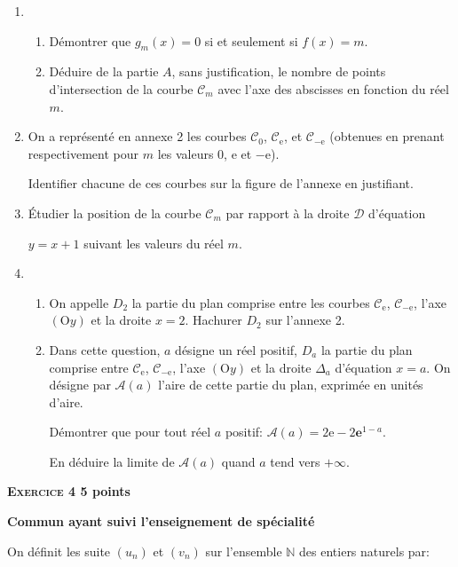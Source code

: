 \documentclass[10pt]{article}
\newcommand{\N}{\mathbb{N}}
\def\e{\text{e}}
\begin{document}
\begin{enumerate}
\item
	\begin{enumerate}
		\item Démontrer que $g_m(x) = 0$ si et seulement si $f(x)=m$.
		\item Déduire de la partie $A$, sans justification, le nombre de points d'intersection de la courbe $\mathcal{C}_m$ avec l'axe des abscisses en fonction du réel $m$.
	\end{enumerate}
\item On a représenté en annexe 2 les courbes $\mathcal{C}_0$, $\mathcal{C}_{\e}$, et $\mathcal{C}_{-\text{e}}$ (obtenues en prenant respectivement pour $m$ les valeurs 0, $\text{e}$ et $-\text{e}$).

Identifier chacune de ces courbes sur la figure de l'annexe en justifiant.
\item Étudier la position de la courbe $\mathcal{C}_m$ par rapport à la droite $\mathcal{D}$ d'équation 

$y = x + 1$ suivant les valeurs du réel $m$.
\item 
	\begin{enumerate}
		\item On appelle $D_2$ la partie du plan comprise entre les courbes $\mathcal{C}_{\text{e}}$, $\mathcal{C}_{-\text{e}}$, l'axe $(\text{O}y)$ et la droite $x = 2$. Hachurer $D_2$ sur l'annexe 2.
		\item Dans cette question, $a$ désigne un réel positif, $D_a$ la partie du plan comprise entre $\mathcal{C}_{\text{e}}$, $\mathcal{C}_{-\text{e}}$, l'axe $(\text{O}y)$ et la droite $\Delta_a$ d'équation $x=a$. On désigne par $\mathcal{A}(a)$ l'aire de cette partie du plan, exprimée en unités d'aire.
		
Démontrer que pour tout réel $a$ positif: $\mathcal{A}(a) = 2\text{e} - 2\mathbf{\text{e}}^{1 - a}$.

En déduire la limite de $\mathcal{A}(a)$ quand $a$ tend vers $+ \infty$.
	\end{enumerate}
\end{enumerate}

\vspace{0,5cm}

\textbf{\textsc{Exercice 4} \hfill 5 points}
 
\textbf{Commun ayant suivi l'enseignement de spécialité}

\medskip

On définit les suite $\left(u_n\right)$ et $\left(v_n\right)$ sur l'ensemble $\N$ des entiers naturels par:
\end{document}
